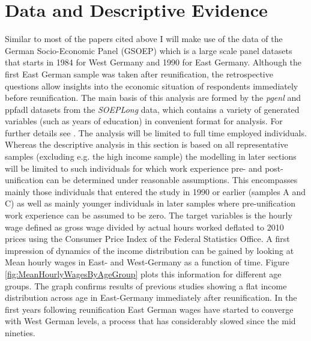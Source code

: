\documentclass{article}
\begin{document}
\section{Data and Descriptive Evidence}
Similar to most of the papers cited above I will make use of the data of the German Socio-Economic Panel (GSOEP) which is a large scale panel datasets that starts in 1984 for West Germany and 1990 for East Germany. Although the first East German sample was taken after reunification, the retrospective questions allow insights into the economic situation of respondents immediately before reunification. The main basis of this analysis are formed by the \textit{pgenl} and ppfadl datasets  from the \textit{SOEPLong} data, which contains a variety of generated variables (such as years of education) in convenient format for analysis. For further details see \cite{wagner_german_2007}.
The analysis will be limited to full time employed individuals. Whereas the descriptive analysis in this section is based on all representative samples (excluding e.g. the high income sample) the modelling in later sections will be limited to such individuals for which work experience pre- and post-unification can be determined under reasonable assumptions. This encompasses mainly those individuals that entered the study in 1990 or earlier (samples A and C) as well as mainly younger individuals in later samples where pre-unification work experience can be assumed to be zero. The target variables is the hourly wage defined as gross wage divided by actual hours worked deflated to 2010 prices using the Consumer Price Index of the Federal Statistics Office. A first impression of dynamics of the income distribution can be gained by looking at Mean hourly wages in East- and West-Germany as a function of time. Figure \ref{fig:MeanHourlyWagesByAgeGroup} plots this information for different age groups. The graph confirms results of previous studies showing a flat income distribution across age in East-Germany immediately after reunification. In the first years following reunification East German wages have  started to converge with West German levels, a process that has considerably slowed since the mid nineties.
\end{document}
